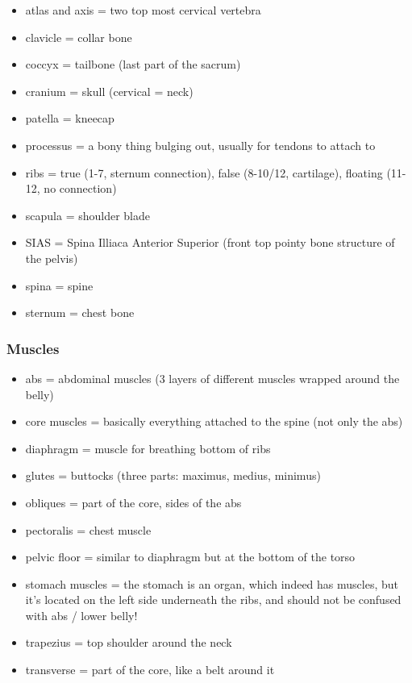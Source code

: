 \begin{itemize}
    \setlength\itemsep{0em}
    \item atlas and axis = two top most cervical vertebra
    \item clavicle = collar bone
    \item coccyx = tailbone (last part of the sacrum)
    \item cranium = skull (cervical = neck)
    \item patella = kneecap
    \item processus = a bony thing bulging out, usually for tendons to attach to
    \item ribs = true (1-7, sternum connection), false (8-10/12, cartilage), floating (11-12, no connection)
    \item scapula = shoulder blade
    \item SIAS = Spina Illiaca Anterior Superior (front top pointy bone structure of the pelvis)
    \item spina = spine
    \item sternum = chest bone
\end{itemize}

\subsubsection{Muscles}

\begin{itemize}
    \setlength\itemsep{0em}
    \item abs = abdominal muscles (3 layers of different muscles wrapped around the belly)
    \item core muscles = basically everything attached to the spine (not only the abs)
    \item diaphragm = muscle for breathing bottom of ribs
    \item glutes = buttocks (three parts: maximus, medius, minimus)
    \item obliques = part of the core, sides of the abs
    \item pectoralis = chest muscle
    \item pelvic floor = similar to diaphragm but at the bottom of the torso
    \item stomach muscles = the stomach is an organ, which indeed has muscles, but it's located on the left side underneath the ribs, and should not be confused with abs / lower belly!
    \item trapezius = top shoulder around the neck
    \item transverse = part of the core, like a belt around it
\end{itemize}

